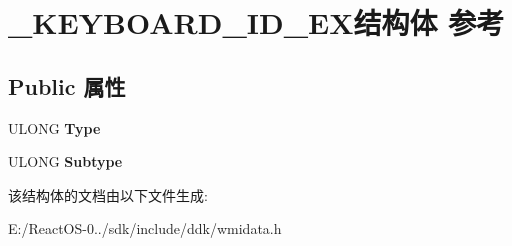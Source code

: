 \hypertarget{struct___k_e_y_b_o_a_r_d___i_d___e_x}{}\section{\+\_\+\+K\+E\+Y\+B\+O\+A\+R\+D\+\_\+\+I\+D\+\_\+\+E\+X结构体 参考}
\label{struct___k_e_y_b_o_a_r_d___i_d___e_x}
\subsection*{Public 属性}
\begin{DoxyCompactItemize}
\item 
\mbox{\label{struct___k_e_y_b_o_a_r_d___i_d___e_x_a607b93027e43b4788a50772e4bb42693}} 
U\+L\+O\+NG {\bfseries Type}
\item 
\mbox{\label{struct___k_e_y_b_o_a_r_d___i_d___e_x_a17c36c8e0236e3dff90a55fbf210fd36}} 
U\+L\+O\+NG {\bfseries Subtype}
\end{DoxyCompactItemize}


该结构体的文档由以下文件生成\+:\begin{DoxyCompactItemize}
\item 
E\+:/\+React\+O\+S-\/0../sdk/include/ddk/wmidata.\+h\end{DoxyCompactItemize}
